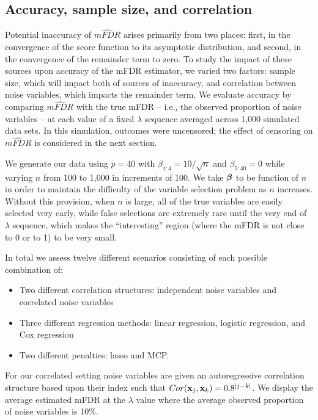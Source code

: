 \subsection{Accuracy, sample size, and correlation}
\label{Sec:accuracy}

Potential inaccuracy of $\widehat{mFDR}$ arises primarily from two places: first, in the convergence of the score function to its asymptotic distribution, and second, in the convergence of the remainder term to zero. To study the impact of these sources upon accuracy of the mFDR estimator, we varied two factors: sample size, which will impact both of sources of inaccuracy, and correlation between noise variables, which impacts the remainder term. We evaluate accuracy by comparing $\widehat{mFDR}$ with the true mFDR -- i.e., the observed proportion of noise variables -- at each value of a fixed $\lambda$ sequence averaged across 1,000 simulated data sets.
In this simulation, outcomes were uncensored; the effect of censoring on $\widehat{mFDR}$ is considered in the next section.

We generate our data using $p = 40$ with $\beta_{1:4} = 10/\sqrt{n}$ and $\beta_{5:40} = 0$ while varying $n$ from 100 to 1,000 in increments of 100. We take $\boldsymbol{\beta}$ to be function of $n$ in order to maintain the difficulty of the variable selection problem as $n$ increases.  Without this provision, when $n$ is large, all of the true variables are easily selected very early, while false selections are extremely rare until the very end of $\lambda$ sequence, which makes the ``interesting'' region (where the mFDR is not close to 0 or to 1) to be very small.

In total we assess twelve different scenarios consisting of each possible combination of:
\begin{itemize}
\item Two different correlation structures: independent noise variables and correlated noise variables
\item Three different regression methods: linear regression, logistic regression, and Cox regression
\item Two different penalties: lasso and MCP. 
\end{itemize}
For our correlated setting noise variables are given an autoregressive correlation structure based upon their index such that $Cor(\mathbf{x}_j,\mathbf{x}_k) = 0.8^{|j - k|}$. We display the average estimated mFDR at the $\lambda$ value where the average observed proportion of noise variables is 10\%.

